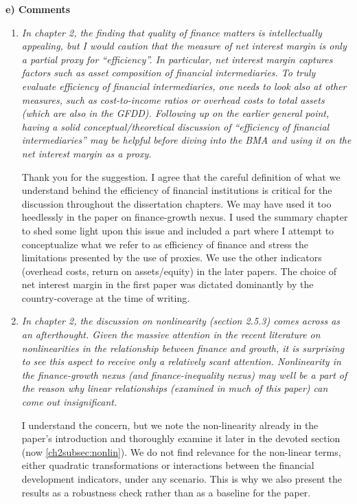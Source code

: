 \textbf{e) Comments}
\begin{enumerate}
    \item \textit{In chapter 2, the finding that quality of finance matters is intellectually appealing, but I would caution that the measure of net interest margin is only a partial proxy for ``efficiency''. In particular, net interest margin captures factors such as asset composition of financial intermediaries. To truly evaluate efficiency of financial intermediaries, one needs to look also at other measures, such as cost-to-income ratios or overhead costs to total assets (which are also in the GFDD). Following up on the earlier general point, having a solid conceptual/theoretical discussion of ``efficiency of financial intermediaries'' may be helpful before diving into the BMA and using it on the net interest margin as a proxy.}
    
    Thank you for the suggestion. I agree that the careful definition of what we understand behind the efficiency of financial institutions is critical for the discussion throughout the dissertation chapters. We may have used it too heedlessly in the paper on finance-growth nexus. I used the summary chapter to shed some light upon this issue and included a part where I attempt to conceptualize what we refer to as efficiency of finance and stress the limitations presented by the use of proxies. We use the other indicators (overhead costs, return on assets/equity) in the later papers. The choice of net interest margin in the first paper was dictated dominantly by the country-coverage at the time of writing.
    
    \item \textit{In chapter 2, the discussion on nonlinearity (section 2.5.3) comes across as an afterthought. Given the massive attention in the recent literature on nonlinearities in the relationship between finance and growth, it is surprising to see this aspect to receive only a relatively scant attention. Nonlinearity in the finance-growth nexus (and finance-inequality nexus) may well be a part of the reason why linear relationships (examined in much of this paper) can come out insignificant.}
    
    I understand the concern, but we note the non-linearity already in the paper's introduction and thoroughly examine it later in the devoted section (now \ref{ch2subsec:nonlin}). We do not find relevance for the non-linear terms, either quadratic transformations or interactions between the financial development indicators, under any scenario. This is why we also present the results as a robustness check rather than as a baseline for the paper.


\end{enumerate}
